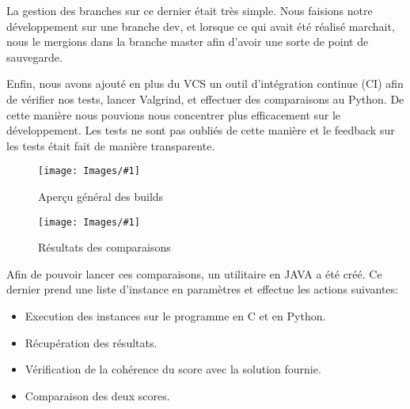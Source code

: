 \documentclass[hideweeklyreports]{polytech/polytech}
\newcommand{\img}[3]{%
	\begin{figure}[H]
		\centering
   		\texttt{[image: Images/\#1]}
  	 	\caption{#2}
	\end{figure}
}
\begin{document}
			La gestion des branches sur ce dernier était très simple. Nous faisions notre développement sur une branche dev, et lorsque ce qui avait été réalisé marchait, nous le mergions dans la branche master afin d'avoir une sorte de point de sauvegarde.
			
			Enfin, nous avons ajouté en plus du VCS un outil d'intégration continue (CI) afin de vérifier nos tests, lancer Valgrind, et effectuer des comparaisons au Python. De cette manière nous pouvions nous concentrer plus efficacement sur le développement. Les tests ne sont pas oubliés de cette manière et le feedback sur les tests était fait de manière transparente.
			\img{TravisAll.png}{Aperçu général des builds}{0.5}
			\img{TravisCompare.png}{Résultats des comparaisons}{0.575}
			
			Afin de pouvoir lancer ces comparaisons, un utilitaire en JAVA a été créé. Ce dernier prend une liste d'instance en paramètres et effectue les actions suivantes:
			\begin{itemize}
				\item Execution des instances sur le programme en C et en Python.
				\item Récupération des résultats.
				\item Vérification de la cohérence du score avec la solution fournie.
				\item Comparaison des deux scores.
			\end{itemize}
			
\end{document}
